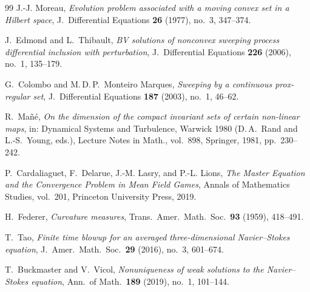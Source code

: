 \documentclass[12pt,a4paper]{article}
\theoremstyle{definition}
\theoremstyle{plain}
\theoremstyle{remark}
\begin{document}
\begin{thebibliography}{99}
J.-J. Moreau,
\emph{Evolution problem associated with a moving convex set in a Hilbert space},
J.~Differential Equations \textbf{26} (1977), no.~3, 347--374.

J.~Edmond and L.~Thibault,
\emph{BV solutions of nonconvex sweeping process differential inclusion with perturbation},
J.~Differential Equations \textbf{226} (2006), no.~1, 135--179.

G.~Colombo and M.\,D.\,P.~Monteiro Marques,
\emph{Sweeping by a continuous prox-regular set},
J.~Differential Equations \textbf{187} (2003), no.~1, 46--62.

R.~Ma\~n\'e,
\emph{On the dimension of the compact invariant sets of certain non-linear maps},
in: Dynamical Systems and Turbulence, Warwick 1980 (D.\,A.~Rand and L.-S.~Young, eds.), Lecture Notes in Math., vol.~898, Springer, 1981, pp.~230--242.

P.~Cardaliaguet, F.~Delarue, J.-M. Lasry, and P.-L. Lions,
\emph{The Master Equation and the Convergence Problem in Mean Field Games},
Annals of Mathematics Studies, vol.~201, Princeton University Press, 2019.

H.~Federer,
\emph{Curvature measures},
Trans.\ Amer.\ Math.\ Soc.\ \textbf{93} (1959), 418--491.

T.~Tao,
\emph{Finite time blowup for an averaged three-dimensional Navier--Stokes equation},
J.~Amer.\ Math.\ Soc.\ \textbf{29} (2016), no.~3, 601--674.

T.~Buckmaster and V.~Vicol,
\emph{Nonuniqueness of weak solutions to the Navier--Stokes equation},
Ann.\ of Math.\ \textbf{189} (2019), no.~1, 101--144.

\end{thebibliography}
\end{document}
